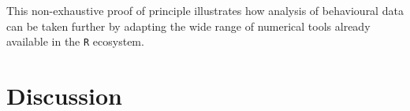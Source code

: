\documentclass[10pt,letterpaper]{article}\usepackage[]{graphicx}\usepackage[]{color}
\begin{document}
This non-exhaustive proof of principle illustrates how analysis of behavioural data can be taken further by adapting the wide range of numerical tools already available in the \texttt{R} ecosystem. 







\section*{Discussion}
\end{document}
